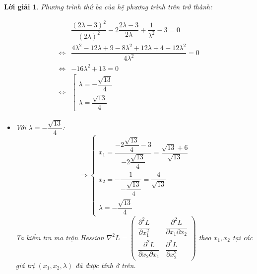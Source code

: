\documentclass[14pt, a4paper]{article}
\theoremstyle{sltheorem}
\theoremstyle{soltheorem}
\newtheorem*{loigiai}{Lời giải}
\begin{document}
\begin{loigiai}
        Phương trình thứ ba của hệ phương trình trên trở thành:

        \begin{equation*}
            \begin{aligned}
                &\dfrac{(2\lambda - 3)^2}{(2\lambda)^2}-2 \dfrac{2\lambda -3}{2\lambda} + \dfrac{1}{\lambda^2}-3=0 \\
                \Leftrightarrow &\dfrac{4\lambda^2 - 12\lambda + 9 - 8\lambda^2 + 12\lambda + 4 - 12\lambda^2}{4\lambda^2}=0 \\ \Leftrightarrow &-16\lambda^2 + 13=0 \\
                \Leftrightarrow &\left [\begin{array}{l} \lambda = - \dfrac{\sqrt{13}}{4} \\ \lambda = \dfrac{\sqrt{13}}{4} \end{array} \right.
            \end{aligned}
        \end{equation*}
        \begin{itemize}
            \item Với $\lambda = - \dfrac{\sqrt{13}}{4}$:
            \begin{equation*}
                \Rightarrow \begin{cases} x_1=\dfrac{-2\dfrac{\sqrt{13}}{4} - 3}{-2\dfrac{\sqrt{13}}{4}}=\dfrac{\sqrt{13} + 6}{\sqrt{13}} \\ x_2 = - \dfrac{1}{-\dfrac{\sqrt{13}}{4}}=\dfrac{4}{\sqrt{13}} \\ \lambda = -\dfrac{\sqrt{13}}{4} \end{cases}
            \end{equation*}
            Ta kiểm tra ma trận Hessian $\nabla^2 L= \begin{pmatrix} \dfrac{\partial^2 L}{\partial x_1^2} & \dfrac{\partial^2 L}{\partial x_1 \partial x_2} \\ \dfrac{\partial^2 L}{\partial x_2 \partial x_1} & \dfrac{\partial^2 L}{\partial x_2^2} \end{pmatrix} $ theo $x_1, x_2$ tại các giá trị $(x_1, x_2, \lambda)$ đã được tính ở trên.


\end{itemize}
\end{loigiai}
\end{document}
